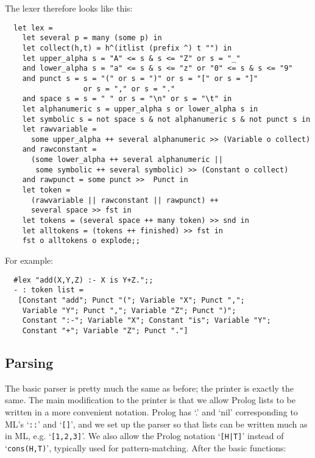 \noindent The lexer therefore looks like this:

\begin{boxed}\begin{verbatim}
  let lex =
    let several p = many (some p) in
    let collect(h,t) = h^(itlist (prefix ^) t "") in
    let upper_alpha s = "A" <= s & s <= "Z" or s = "_"
    and lower_alpha s = "a" <= s & s <= "z" or "0" <= s & s <= "9"
    and punct s = s = "(" or s = ")" or s = "[" or s = "]"
                  or s = "," or s = "."
    and space s = s = " " or s = "\n" or s = "\t" in
    let alphanumeric s = upper_alpha s or lower_alpha s in
    let symbolic s = not space s & not alphanumeric s & not punct s in
    let rawvariable =
      some upper_alpha ++ several alphanumeric >> (Variable o collect)
    and rawconstant =
      (some lower_alpha ++ several alphanumeric ||
       some symbolic ++ several symbolic) >> (Constant o collect)
    and rawpunct = some punct >>  Punct in
    let token =
      (rawvariable || rawconstant || rawpunct) ++
      several space >> fst in
    let tokens = (several space ++ many token) >> snd in
    let alltokens = (tokens ++ finished) >> fst in
    fst o alltokens o explode;;
\end{verbatim}\end{boxed}

\noindent For example:

\begin{boxed}\begin{verbatim}
  #lex "add(X,Y,Z) :- X is Y+Z.";;
  - : token list =
   [Constant "add"; Punct "("; Variable "X"; Punct ",";
    Variable "Y"; Punct ","; Variable "Z"; Punct ")";
    Constant ":-"; Variable "X"; Constant "is"; Variable "Y";
    Constant "+"; Variable "Z"; Punct "."]
\end{verbatim}\end{boxed}

\subsection{Parsing}

The basic parser is pretty much the same as before; the printer is exactly the
same. The main modification to the printer is that we allow Prolog lists to be
written in a more convenient notation. Prolog has `.' and `nil' corresponding
to ML's `{\tt ::}' and `{\tt []}', and we set up the parser so that lists can
be written much as in ML, e.g. `{\tt [1,2,3]}'. We also allow the Prolog
notation `{\verb+[H|T]+}' instead of `{\verb+cons(H,T)+}', typically used for
pattern-matching. After the basic functions:

